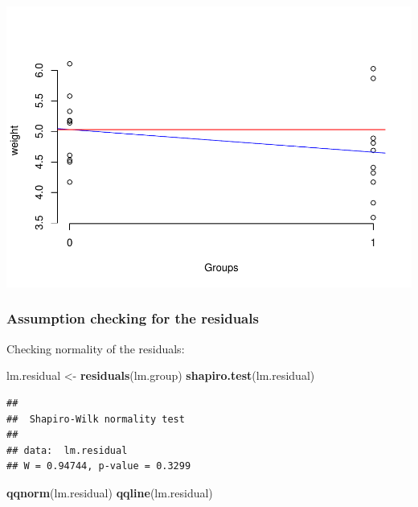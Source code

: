\documentclass[
]{book}
\newenvironment{Shaded}{\begin{snugshade}}{\end{snugshade}}
\newcommand{\KeywordTok}[1]{\textcolor[rgb]{0.13,0.29,0.53}{\textbf{#1}}}
\newcommand{\NormalTok}[1]{#1}
\newcommand{\StringTok}[1]{\textcolor[rgb]{0.31,0.60,0.02}{#1}}
\begin{document}
\includegraphics{SurveyBook_files/figure-latex/simpleAnalysisplot-1.pdf}

\hypertarget{assumption-checking-for-the-residuals}{%
\subsubsection{Assumption checking for the residuals}\label{assumption-checking-for-the-residuals}}

Checking normality of the residuals:

\begin{Shaded}
\begin{Highlighting}[]
\NormalTok{lm.residual <-}\StringTok{ }\KeywordTok{residuals}\NormalTok{(lm.group)}
\KeywordTok{shapiro.test}\NormalTok{(lm.residual)}
\end{Highlighting}
\end{Shaded}

\begin{verbatim}
## 
## 	Shapiro-Wilk normality test
## 
## data:  lm.residual
## W = 0.94744, p-value = 0.3299
\end{verbatim}

\begin{Shaded}
\begin{Highlighting}[]
\KeywordTok{qqnorm}\NormalTok{(lm.residual)}
\KeywordTok{qqline}\NormalTok{(lm.residual)}
\end{Highlighting}
\end{Shaded}
\end{document}
